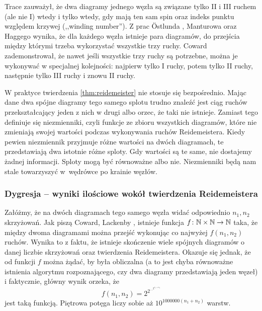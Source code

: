 Trace \cite{trace1983} zauważył, że dwa diagramy jednego węzła są związane tylko II i III ruchem (ale nie I) wtedy i tylko wtedy, gdy mają ten sam spin oraz indeks punktu względem krzywej (,,winding number'').
%
Z prac Östlunda \cite{ostlund2001}, Manturowa \cite[s. ???]{manturov2004} oraz Haggego \cite{hagge2006} wynika, że dla każdego węzła istnieje para diagramów, do przejścia między którymi trzeba wykorzystać wszystkie trzy ruchy.
%
%
%
Coward \cite{coward2006} zademonstrował, że nawet jeśli wszystkie trzy ruchy są potrzebne, można je wykonywać w specjalnej kolejności: najpierw tylko I ruchy, potem tylko II ruchy, następnie tylko III ruchy i znowu II ruchy.
%

W praktyce twierdzenia \ref{thm:reidemeister} nie stosuje się bezpośrednio.
Mając dane dwa spójne diagramy tego samego splotu trudno znaleźć jest ciąg ruchów przekształcający jeden z nich w drugi albo orzec, że taki nie istnieje.
Zamiast tego definiuje się niezmienniki, czyli funkcje ze zbioru wszystkich diagramów, które nie zmieniają swojej wartości podczas wykonywania ruchów Reidemeistera.
Kiedy pewien niezmiennik przyjmuje różne wartości na dwóch diagramach, te przedstawiają dwa istotnie różne sploty.
Gdy wartości są te same, nie dostajemy żadnej informacji.
Sploty mogą być równoważne albo nie.
Niezmienniki będą nam stale towarzyszyć w~wędrówce po krainie węzłów.

\subsubsection{Dygresja -- wyniki ilościowe wokół twierdzenia Reidemeistera}
Załóżmy, że na dwóch diagramach tego samego węzła widać odpowiednio $n_1, n_2$ skrzyżowań.
Jak piszą Coward, Lackenby \cite{coward2011}, istnieje funkcja $f \colon \mathbb N \times \mathbb N \to \mathbb N$ taka, że między dwoma diagramami można przejść wykonując co najwyżej $f(n_1, n_2)$ ruchów.
%
%
Wynika to z faktu, że istnieje skończenie wiele spójnych diagramów o danej liczbie skrzyżowań oraz twierdzenia Reidemeistera.
Okazuje się jednak, że od funkcji $f$ można żądać, by była obliczalna
(a to jest chyba równoważne istnienia algorytmu rozpoznającego, czy dwa diagramy przedstawiają jeden węzeł)
i faktycznie, główny wynik \cite{coward2011} orzeka, że
\begin{equation}
    f(n_1, n_2) = 2^{2^{\ldots^{2^{n_1 + n_2}}}}
\end{equation}
jest taką funkcją.
Piętrowa potęga liczy sobie aż $10^{1000000 (n_1 + n_2)}$ warstw.

